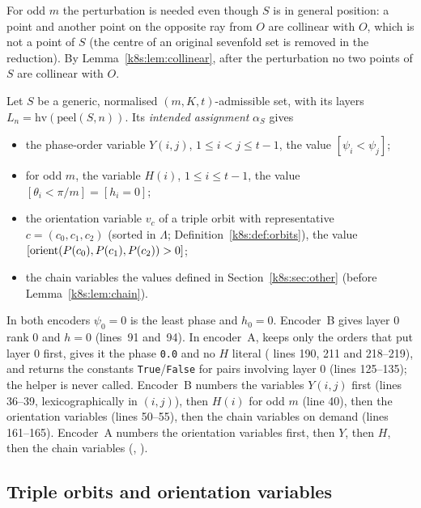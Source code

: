 For odd $m$ the perturbation is needed even though $S$ is in general position: a point and another point on the
opposite ray from $O$ are collinear with $O$, which is not a point of $S$ (the centre of an original sevenfold set is
removed in the reduction). By Lemma~\ref{k8s:lem:collinear}, after the perturbation no two points of $S$ are
collinear with $O$.

\begin{definition}\label{k8s:def:assign}
Let $S$ be a generic, normalised $(m,K,t)$-admissible set, with its layers $L_n=\mathrm{hv}(\mathrm{peel}(S,n))$. Its
\emph{intended assignment} $\alpha_S$ gives
\begin{itemize}
\item the phase-order variable $Y(i,j)$, $1\le i<j\le t-1$, the value $[\psi_i<\psi_j]$;
\item for odd $m$, the variable $H(i)$, $1\le i\le t-1$, the value $[\theta_i<\pi/m]=[h_i=0]$;
\item the orientation variable $v_c$ of a triple orbit with representative $c=(c_0,c_1,c_2)$ (sorted in $\Lambda$;
Definition~\ref{k8s:def:orbits}), the
value $[\operatorname{orient}(P(c_0),P(c_1),P(c_2))>0]$;
\item the chain variables the values defined in Section~\ref{k8s:sec:other} (before Lemma~\ref{k8s:lem:chain}).
\end{itemize}
\end{definition}

In both encoders $\psi_0=0$ is the least phase and $h_0=0$. Encoder~B gives layer $0$ rank $0$ and $h=0$ (lines~91
and~94). In encoder~A,  keeps only the orders that put layer $0$ first, gives it the phase
\texttt{0.0} and no $H$ literal ( lines 190, 211 and 218--219), and  returns the constants
\texttt{True}/\texttt{False} for pairs involving layer $0$ (lines 125--135); the helper  is never called.
Encoder~B numbers the variables
$Y(i,j)$ first (lines 36--39, lexicographically in $(i,j)$), then $H(i)$ for odd $m$ (line 40), then the orientation
variables (lines 50--55), then the chain variables on demand (lines 161--165). Encoder~A numbers the orientation
variables first, then $Y$, then $H$, then the chain variables (, ).

\subsection{Triple orbits and orientation variables}\label{k8s:sec:orbits}

